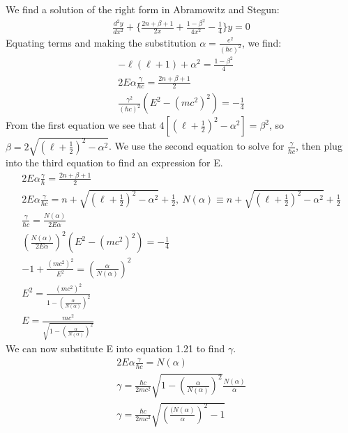 \documentclass[a4paper,10pt]{article}
\numberwithin{equation}{section}
\begin{document}
We find a solution of the right form in Abramowitz and Stegun:
\begin{gather}
 \frac{d^2y}{dx^2}+\{\frac{2n+\beta +1}{2x}+\frac{1-\beta ^2}{4x^2}-\frac{1}{4} \}y=0
\end{gather}
Equating terms and making the substitution $\alpha=\frac{e^2}{(\hbar c)^2}$, we find:
\begin{gather}
  -\ell(\ell+1)+\alpha^2=\frac{1-\beta ^2}{4}\\
  2E\alpha \frac{\gamma}{\hbar c} =\frac{2n+\beta +1}{2}\\
 \frac{\gamma^2}{(\hbar c)^2}(E^2-(mc^2)^2)=-\frac{1}{4}
\end{gather}
From the first equation we see that $4[(\ell+\frac{1}{2})^2-\alpha ^2]=\beta^2$, so $\beta=2\sqrt{(\ell+\frac{1}{2})^2-\alpha ^2}$.
We use the second equation to solve for $\frac{\gamma}{\hbar c}$, then plug into the third equation to find an expression for E.
\begin{gather}
 2E\alpha \frac{\gamma}{\hbar}=\frac{2n+\beta+1}{2}\\
 2E\alpha \frac{\gamma}{\hbar c}=n+\sqrt{(\ell+\frac{1}{2})^2-\alpha^2}+\frac{1}{2},\ 
 N(\alpha) \equiv n+\sqrt{(\ell+\frac{1}{2})^2-\alpha^2}+\frac{1}{2}\\
 \frac{\gamma}{\hbar c}=\frac{N(\alpha)}{2E\alpha}\\
 (\frac{N(\alpha)}{2E\alpha})^2(E^2-(mc^2)^2)=-\frac{1}{4}\\
 -1+\frac{(mc^2)^2}{E^2}=(\frac{\alpha}{N(\alpha)})^2\\
 E^2=\frac{(mc^2)^2}{1-(\frac{\alpha}{N(\alpha)})^2}\\
 E=\frac{mc^2}{\sqrt{1-(\frac{\alpha}{N(\alpha)})^2}}
\end{gather}
We can now substitute E into equation 1.21 to find $\gamma$.
\begin{gather}
 2E\alpha \frac{\gamma}{\hbar c}=N(\alpha)\\
 \gamma = \frac{\hbar c}{2mc^2}\sqrt{1-(\frac{\alpha}{N(\alpha)})^2}\frac{N(\alpha)}{\alpha}\\
 \gamma = \frac{\hbar c}{2mc^2}\sqrt{(\frac{(N(\alpha)}{\alpha})^2-1}
\end{gather}
\end{document}
